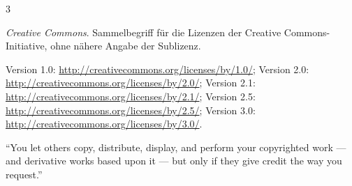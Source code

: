 \begin{WidePar}
\scriptsize
\begin{multicols}{3}

\noindent{}

\begin{description}
\setlength{\parskip}{0pt}
  \item[CC]
  \emph{Creative Commons}. Sammelbegriff für die Lizenzen der
  Creative Commons-Initiative, ohne nähere Angabe der Sublizenz.
  
  \item[CC-BY]
  \begin{inparadesc}
    \item[Lizenztext (Link):]
    Version 1.0: \url{http://creativecommons.org/licenses/by/1.0/};
    Version 2.0: \url{http://creativecommons.org/licenses/by/2.0/};
    Version 2.1: \url{http://creativecommons.org/licenses/by/2.1/};
    Version 2.5: \url{http://creativecommons.org/licenses/by/2.5/};
    Version 3.0: \url{http://creativecommons.org/licenses/by/3.0/}.
    \item[Kurzfassung (ohne Gewähr):] \enquote{You let others copy, distribute,
    display, and perform your copyrighted work — and derivative works based
    upon it — but only if they give credit the way you
    request.}
  \end{inparadesc}
  

\end{description}
\end{multicols}
\end{WidePar}
